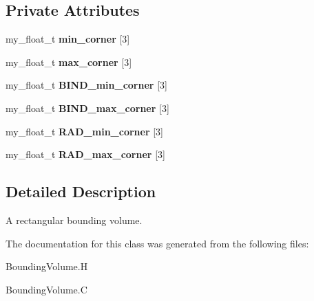 \subsection*{Private Attributes}
\begin{CompactItemize}
\item 
my\_\-float\_\-t \textbf{min\_\-corner} [3]\label{classSimSite3D_1_1RectangularSolid_a57a2744d2006581f35568bd2e43ea58}

\item 
my\_\-float\_\-t \textbf{max\_\-corner} [3]\label{classSimSite3D_1_1RectangularSolid_6d297afcc473c3cc2336c3017e7f638a}

\item 
my\_\-float\_\-t \textbf{BIND\_\-min\_\-corner} [3]\label{classSimSite3D_1_1RectangularSolid_fdbc647071b0beff1c695f5919eecf14}

\item 
my\_\-float\_\-t \textbf{BIND\_\-max\_\-corner} [3]\label{classSimSite3D_1_1RectangularSolid_bd9eb2d180cd46f6325a483d809c17f5}

\item 
my\_\-float\_\-t \textbf{RAD\_\-min\_\-corner} [3]\label{classSimSite3D_1_1RectangularSolid_f06af8b6554856ea2fb19d943c1a5b3b}

\item 
my\_\-float\_\-t \textbf{RAD\_\-max\_\-corner} [3]\label{classSimSite3D_1_1RectangularSolid_463d6a3ed40fa149db9cdccd456cd075}

\end{CompactItemize}


\subsection{Detailed Description}
A rectangular bounding volume. 



The documentation for this class was generated from the following files:\begin{CompactItemize}
\item 
Bounding\-Volume.H\item 
Bounding\-Volume.C\end{CompactItemize}
